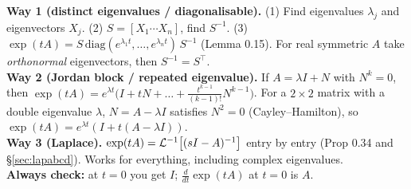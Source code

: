 \begin{methodbox}[title={Method: computing $\exp(tA)$ (three ways)}]
\textbf{Way 1 (distinct eigenvalues / diagonalisable).}
(1) Find eigenvalues $\lambda_j$ and eigenvectors $X_j$. (2) $S=[X_1\cdots X_n]$, find $S^{-1}$.
(3) $\exp(tA)=S\,\mathrm{diag}(e^{\lambda_1t},\dots,e^{\lambda_nt})\,S^{-1}$ (Lemma 0.15).
For real symmetric $A$ take \emph{orthonormal} eigenvectors, then $S^{-1}=S^\top$.\\[1mm]
\textbf{Way 2 (Jordan block / repeated eigenvalue).} If $A=\lambda I+N$ with $N^k=0$, then
$\exp(tA)=e^{\lambda t}\big(I+tN+\dots+\frac{t^{k-1}}{(k-1)!}N^{k-1}\big)$. For a $2\times2$ matrix with a double eigenvalue $\lambda$, $N=A-\lambda I$ satisfies $N^2=0$ (Cayley--Hamilton), so $\boxed{\exp(tA)=e^{\lambda t}(I+t(A-\lambda I))}$.\\[1mm]
\textbf{Way 3 (Laplace).} $\exp(tA)=\mathcal{L}^{-1}\big[(sI-A)^{-1}\big]$ entry by entry (Prop 0.34 and \S\ref{sec:lapabcd}). Works for everything, including complex eigenvalues.\\[1mm]
\textbf{Always check:} at $t=0$ you get $I$; $\frac{d}{dt}\exp(tA)$ at $t=0$ is $A$.
\end{methodbox}

